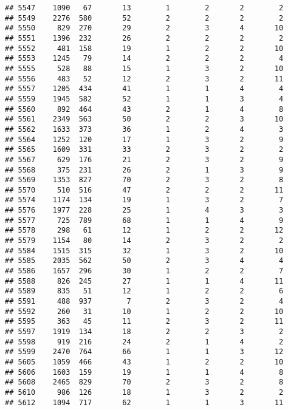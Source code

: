 \documentclass[]{article}
\begin{document}
\begin{verbatim}
## 5547    1090   67       13        1        2       2        2
## 5549    2276  580       52        2        2       2        2
## 5550     829  270       29        2        3       4       10
## 5551    1396  232       26        2        2       2        2
## 5552     481  158       19        1        2       2       10
## 5553    1245   79       14        2        2       2        4
## 5555     528   88       15        1        3       2       10
## 5556     483   52       12        2        3       2       11
## 5557    1205  434       41        1        1       4        4
## 5559    1945  582       52        1        1       3        4
## 5560     892  464       43        2        1       4        8
## 5561    2349  563       50        2        2       3       10
## 5562    1633  373       36        1        2       4        3
## 5564    1252  120       17        1        3       2        9
## 5565    1609  331       33        2        3       2        2
## 5567     629  176       21        2        3       2        9
## 5568     375  231       26        2        1       3        9
## 5569    1353  827       70        2        3       2        8
## 5570     510  516       47        2        2       2       11
## 5574    1174  134       19        1        3       2        7
## 5576    1977  228       25        1        4       3        3
## 5577     725  789       68        1        1       4        9
## 5578     298   61       12        1        2       2       12
## 5579    1154   80       14        2        3       2        2
## 5584    1515  315       32        1        3       2       10
## 5585    2035  562       50        2        3       4        4
## 5586    1657  296       30        1        2       2        7
## 5588     826  245       27        1        1       4       11
## 5589     835   51       12        1        2       2        6
## 5591     488  937        7        2        3       2        4
## 5592     260   31       10        1        2       2       10
## 5595     363   45       11        2        3       2       11
## 5597    1919  134       18        2        2       3        2
## 5598     919  216       24        2        1       4        2
## 5599    2470  764       66        1        1       3       12
## 5605    1059  466       43        1        2       2       10
## 5606    1603  159       19        1        1       4        8
## 5608    2465  829       70        2        3       2        8
## 5610     986  126       18        1        3       2        2
## 5612    1094  717       62        1        1       3       11

\end{verbatim}
\end{document}
